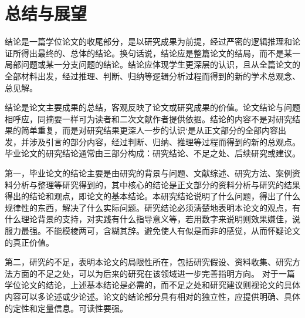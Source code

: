 \section{总结与展望}     
结论是一篇学位论文的收尾部分，是以研究成果为前提，经过严密的逻辑推理和论证所得出最终的、总体的结论。换句话说，结论应是整篇论文的结局，而不是某一局部问题或某一分支问题的结论。结论应体现学生更深层的认识，且从全篇论文的全部材料出发，经过推理、判断、归纳等逻辑分析过程而得到的新的学术总观念、总见解。

结论是论文主要成果的总结，客观反映了论文或研究成果的价值。论文结论与问题相呼应，同摘要一样可为读者和二次文献作者提供依据。结论的内容不是对研究结果的简单重复，而是对研究结果更深人一步的认识‘是从正文部分的全部内容出发，并涉及引言的部分内容，经过判断、归纳、推理等过程而得到的新的总观点。毕业论文的研究结论通常由三部分构成：研究结论、不足之处、后续研究或建议。

第一，毕业论文的结论主要是由研究的背景与问题、文献综述、研究方法、案例资料分析与整理等研究得到的，其中核心的结论是正文部分的资料分析与研究的结果得出的结论和观点，即论文的基本结论。本研究结论说明了什么问题，得出了什么规律性的东西，解决了什么实际问题。研究结论必须淸楚地表明本论文的观点，有什么理论背景的支持，对实践有什么指导意义等，若用数字来说明则效果嫌佳，说服力最强。不能模棱两可，含糊其辞。避免使人有似是而非的感觉，从而怀疑论文的真正价值。 

第二，研究的不足，表明本论文的局限性所在，包括研究假设、资料收集、研究方法方面的不足之处，可以为后来的研究在该领域进一步完善指明方向。
对于一篇学位论文的结论，上述基本结论是必需的，而不足之处和研究建议则视论文的具体内容可以多论述或少论述。论文的结论部分具有相对的独立性，应提供明确、具体的定性和定量信息。可读性要强。
